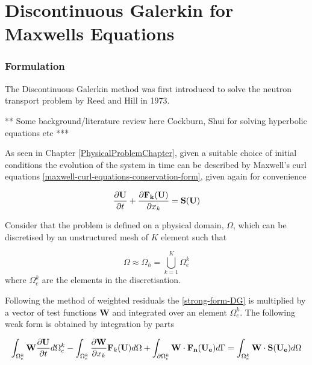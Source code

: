 \chapter{Discontinuous Galerkin for Maxwells Equations} %
\label{Chapter3}

\subsection{Formulation}

The Discontinuous Galerkin method was first introduced to solve the neutron transport problem by Reed and Hill \cite{} in 1973.

** Some background/literature review here Cockburn, Shui for solving hyperbolic equations etc ***

As seen in Chapter \ref{PhysicalProblemChapter}, given a suitable choice of initial conditions the evolution of the system in time can be described by Maxwell's curl equations \eqref{maxwell-curl-equations-conservation-form}, given again for convenience

$$
\frac{\partial \mathbf{U}}{\partial t} + \frac{\partial \mathbf{F_k (\mathbf{U})} }{\partial x_k}  = \mathbf{S(U)}
\label{strong-form-DG}
$$

Consider that the problem is defined on a physical domain, $\Omega$, which can be discretised by an unstructured mesh of $K$ element such that

\begin{equation}
  \Omega \approx \Omega_h = \mathop{\bigcup}_{k=1}^{K} \Omega_e^k
\end{equation}
where $\Omega_e^k$ are the elements in the discretisation.  


Following the method of weighted residuals the \eqref{strong-form-DG} is multiplied by a vector of test functions $\mathbf{W}$ and integrated over an element $\Omega_e^k$. The following weak form is obtained by integration by parts

$$
\int_{\Omega_e^k} \mathbf{W} \frac{\partial \mathbf{U}}{\partial t} d\Omega_e^k  - \int_{\Omega_e^k} \frac{\partial \mathbf{W}}{ \partial x_k} \mathbf{F}_k(\mathbf{U}) d\Omega + \int_{\partial \Omega_e^k} \mathbf{W} \cdot \mathbf{F_n}(\mathbf{U_e}) d\Gamma = \int_{\Omega_e^k} \mathbf{W} \cdot \mathbf{S}(\mathbf{U_e}) d\Omega
\label{maxwell-DG-weak-form}
$$

